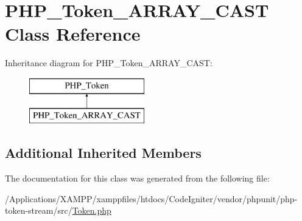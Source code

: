 \hypertarget{class_p_h_p___token___a_r_r_a_y___c_a_s_t}{}\section{P\+H\+P\+\_\+\+Token\+\_\+\+A\+R\+R\+A\+Y\+\_\+\+C\+A\+ST Class Reference}
\label{class_p_h_p___token___a_r_r_a_y___c_a_s_t}
Inheritance diagram for P\+H\+P\+\_\+\+Token\+\_\+\+A\+R\+R\+A\+Y\+\_\+\+C\+A\+ST\+:\begin{figure}[H]
\begin{center}
\leavevmode
\includegraphics[height=2.000000cm]{class_p_h_p___token___a_r_r_a_y___c_a_s_t}
\end{center}
\end{figure}
\subsection*{Additional Inherited Members}


The documentation for this class was generated from the following file\+:\begin{DoxyCompactItemize}
\item 
/\+Applications/\+X\+A\+M\+P\+P/xamppfiles/htdocs/\+Code\+Igniter/vendor/phpunit/php-\/token-\/stream/src/\mbox{\hyperlink{_token_8php}{Token.\+php}}\end{DoxyCompactItemize}
